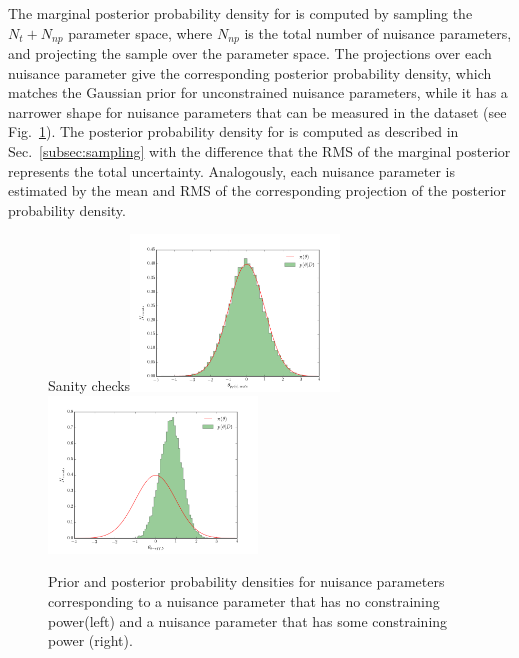 \documentclass[a4paper]{article}
\begin{document}
The marginal posterior probability density for \Truth{} is computed by
sampling the $N_t+N_{np}$ parameter space, where $N_{np}$ is the
total number of nuisance parameters, and projecting the sample over
the \Truth{} parameter space. The projections over each nuisance
parameter give the corresponding posterior probability density,
which matches the Gaussian prior for unconstrained nuisance
parameters, while it has a narrower shape for nuisance parameters
that can be measured in the dataset (see Fig.~\ref{fig:nuisparpost}).
The posterior probability density for \AC{} is computed as described in
Sec.~\ref{subsec:sampling} with the difference that the RMS of the
marginal posterior represents the total uncertainty. Analogously, each
nuisance parameter is estimated by the mean and RMS of the
corresponding projection of the posterior probability density.
\begin{figure}[!htb]\centering
Sanity checks\includegraphics[width=0.495\textwidth]{unconstrainednp.png}
\includegraphics[width=0.495\textwidth]{constrainednp.png}
\caption{Prior and posterior probability densities for nuisance parameters
corresponding to a nuisance parameter that has no constraining power(left) and a
nuisance parameter that has some constraining power (right).}
\label{fig:nuisparpost}
\end{figure}
\end{document}
